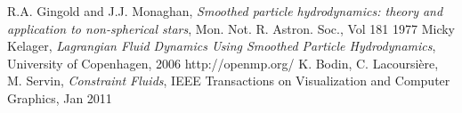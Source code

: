 \documentclass[a4paper,12pt,oneside,final]{extarticle}
\begin{document}





\clearpage

\begin{thebibliography}{9}
  
  R.A. Gingold and J.J. Monaghan, \emph{Smoothed particle hydrodynamics: theory and application to non-spherical stars}, Mon. Not. R. Astron. Soc., Vol 181 1977
  Micky Kelager, \emph{Lagrangian Fluid Dynamics Using Smoothed Particle Hydrodynamics}, University of Copenhagen, 2006
  http://openmp.org/
   K. Bodin, C. Lacoursière, M. Servin, \emph{Constraint Fluids}, IEEE Transactions on Visualization and Computer Graphics, Jan 2011 
\end{thebibliography}
\end{document}
